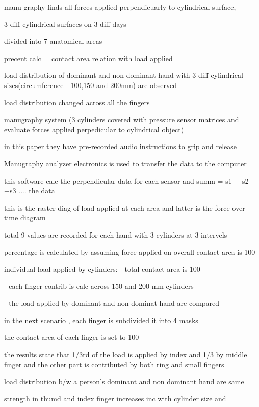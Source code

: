 manu graphy finds all forces applied perpendicuarly to cylindrical surface,

3 diff cylindrical surfaces on 3 diff days

divided into 7 anatomical areas

precent calc = contact area relation with load applied

load distribution of dominant and non dominant hand with 3 diff cylindrical sizes(circumference - 100,150 and 200mm) are observed

load distribution changed across all the fingers

manugraphy system (3 cylinders covered with pressure sensor matrices and evaluate forces applied perpedicular to cylindrical object)

in this paper they have pre-recorded audio instructions to grip and release

Manugraphy analyzer electronics is used to transfer the data to the computer

this software calc the perpendicular data for each sensor and summ = s1 + s2 +s3 .... the data

this is the raster diag of load applied at each area and latter is the force over time diagram

total 9 values are recorded for each hand with 3 cylinders at 3 intervels

percentage is calculated by assuming force applied on overall contact area is 100%

individual load applied by cylinders:
 - total contact area is 100%

 - each finger contrib is calc across 150 and 200 mm cylinders 

 - the load applied by dominant and non dominat hand are compared 

 in the next scenario , each finger is subdivided it into 4 masks

 the contact area of each finger is set to 100%

 the results state that 1/3rd of the load is applied by index and 1/3 by middle finger and the other part is contributed by both ring and small fingers

 load distribution b/w a person's dominant and non dominant hand are same

 strength in thumd and index finger increases inc with cylinder size and 